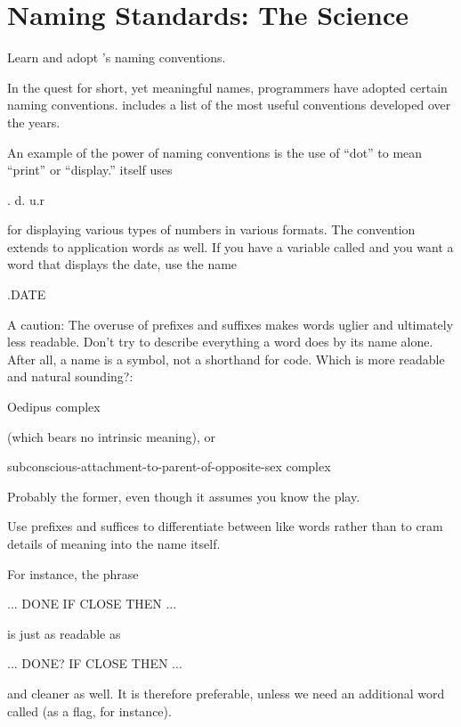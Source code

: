 \section{Naming Standards: The Science}%

\begin{tip}
Learn and adopt \Forth{}'s naming conventions.
\end{tip}
In the quest for short, yet meaningful names, \Forth{} programmers
have adopted certain naming conventions.   includes a list of
the most useful conventions developed over the years.

An example of the power of naming conventions is the use of ``dot''
to mean ``print'' or ``display.'' \Forth{} itself uses
\begin{Code}
.   d.   u.r
\end{Code}
for displaying various types of numbers in various formats.  The
convention extends to application words as well.  If you have a
variable called  and you want a word that displays the
date, use the name
\begin{Code}
.DATE
\end{Code}
%
%
A caution: The overuse of prefixes and suffixes makes words uglier and
ultimately less readable.  Don't try to describe everything a word
does by its name alone.  After all, a name is a symbol, not a
shorthand for code.  Which is more readable and natural sounding?:

\begin{tfquot}
Oedipus complex
\end{tfquot}
(which bears no intrinsic meaning), or
\begin{tfquot}
subconscious-attachment-to-parent-of-opposite-sex complex
\end{tfquot}
Probably the former, even though it assumes you know the play.

\begin{tip}
Use prefixes and suffices to differentiate between like words rather
than to cram details of meaning into the name itself.
\end{tip}
For instance, the phrase
\begin{Code}
... DONE IF CLOSE THEN ...
\end{Code}
is just as readable as
\begin{Code}
... DONE? IF CLOSE THEN ...
\end{Code}
and cleaner as well.  It is therefore preferable, unless we need an
additional word called  (as a flag, for instance).

